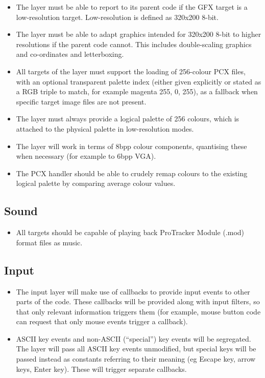 \documentclass[a4paper]{scrbook}
\begin{document}
\begin{itemize}
  \item The layer must be able to report to its parent code if the GFX
    target is a low-resolution target. Low-resolution is defined as
    320x200 8-bit.
  \item The layer must be able to adapt graphics intended for 320x200
    8-bit to higher resolutions if the parent code cannot. This
    includes double-scaling graphics and co-ordinates and
    letterboxing.
  \item All targets of the layer must support the loading of
    256-colour PCX files, with an optional transparent palette index
    (either given explicitly or stated as a RGB triple to match, for
    example magenta 255, 0, 255), as a fallback when specific target
    image files are not present.
  \item The layer must always provide a logical palette of 256
    colours, which is attached to the physical palette in
    low-resolution modes.
  \item The layer will work in terms of 8bpp colour components,
    quantising these when necessary (for example to 6bpp VGA).
  \item The PCX handler should be able to crudely remap colours to the
    existing logical palette by comparing average colour values.
\end{itemize}

\subsection{Sound}

\begin{itemize}
  \item All targets should be capable of playing back ProTracker
    Module (.mod) format files as music.
\end{itemize}

\subsection{Input}

\begin{itemize}
  \item The input layer will make use of callbacks to provide input
    events to other parts of the code. These callbacks will be
    provided along with input filters, so that only relevant
    information triggers them (for example, mouse button code can
    request that only mouse events trigger a callback).
  \item ASCII key events and non-ASCII (``special'') key events will
    be segregated. The layer will pass all ASCII key events
    unmodified, but special keys will be passed instead as constants
    referring to their meaning (eg Escape key, arrow keys, Enter
    key). These will trigger separate callbacks.
\end{itemize}
\end{document}
